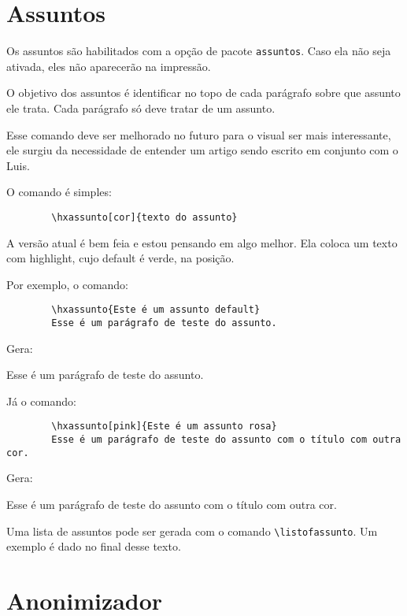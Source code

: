 \documentclass{article}
\begin{document}
    \section{Assuntos}
    
    Os assuntos são habilitados com a opção de pacote \verb!assuntos!. Caso ela não seja ativada, eles não aparecerão na impressão.
    
    O objetivo dos assuntos é identificar no topo de cada parágrafo sobre que assunto ele trata. Cada parágrafo só deve tratar de um assunto.
    
    Esse comando deve ser melhorado no futuro para o visual ser mais interessante, ele surgiu da necessidade de entender um artigo sendo escrito em conjunto com o Luis.
    
    O comando é simples:
    
    \begin{verbatim}
        \hxassunto[cor]{texto do assunto}
    \end{verbatim}
    
    A versão atual é bem feia e estou pensando em algo melhor. Ela coloca um texto com highlight, cujo default é verde, na posição.
    
    Por exemplo, o comando:
    \begin{verbatim}
        \hxassunto{Este é um assunto default}
        Esse é um parágrafo de teste do assunto.
    \end{verbatim}
    
    Gera:
    
    Esse é um parágrafo de teste do assunto.
    
    
    Já o comando:
    \begin{verbatim}
        \hxassunto[pink]{Este é um assunto rosa}
        Esse é um parágrafo de teste do assunto com o título com outra cor.
    \end{verbatim}
    
    
    Gera:
    
    Esse é um parágrafo de teste do assunto com o título com outra cor.
    
    
    Uma lista de assuntos pode ser gerada com o comando
    \verb!\listofassunto!. Um exemplo é dado no final desse texto.
    
    \section{Anonimizador}
    
\end{document}
